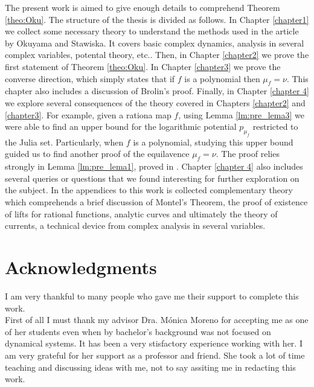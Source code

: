 \documentclass[12pt,letterpaper,twoside]{book}
\theoremstyle{definition}
\begin{document}
The present work is aimed to give enough details to comprehend Theorem \ref{theo:Oku}. The structure of the thesis is divided as follows. In Chapter \ref{chapter1} we collect some necessary theory to understand the methods used in the article by Okuyama and Stawiska. It covers basic complex dynamics, analysis in several complex variables, potental theory, etc.. Then, in Chapter \ref{chapter2} we prove the first statement of Theorem \ref{theo:Oku}. In Chapter \ref{chapter3} we prove the converse direction, which simply states that if $f$ is a polynomial then $\mu_f=\nu$. This chapter also includes a discussion of Brolin's proof. Finally, in Chapter \ref{chapter 4} we explore several consequences of the theory covered in Chapters \ref{chapter2} and \ref{chapter3}. For example, given a rationa map $f$, using Lemma \ref{lm:pre_lema3} we were able to find an upper bound for the logarithmic potential $p_{\mu_f}$ restricted to the Julia set. Particularly, when $f$ is a polynomial, studying this upper bound guided us to find another proof of the equilavence $\mu_f=\nu$. The proof relies strongly in Lemma \ref{lm:pre_lema1}, proved in \cite{okuyama}. Chapter \ref{chapter 4} also includes several queries or questions that we found interesting for further exploration on the subject. In the appendices to this work is collected complementary theory which comprehends a brief discussion of Montel's Theorem, the proof of existence of lifts for rational functions, analytic curves and ultimately the theory of currents, a technical device from complex analysis in several variables.

\chapter*{Acknowledgments}
I am very thankful to many people who gave me their support to complete this work.\\

First of all I must thank my advisor Dra. Mónica Moreno for accepting me as one of her students even when by bachelor's background was not focused on dynamical systems. It has been a very stisfactory experience working with her. I am very grateful for her support as a professor and friend. She took a lot of time teaching and discussing ideas with me, not to say assiting me in redacting this work.\\
\end{document}
